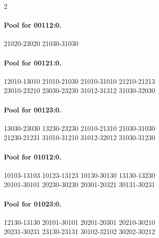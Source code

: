 \documentclass[11pt]{article}
\numberwithin{equation}{section}
\numberwithin{table}{section}
\begin{document}
\begin{multicols}{2}
\paragraph{Pool for 00112:0.}
\begingroup\footnotesize\ttfamily\begin{flushleft}
21020-23020 21030-31030\\
\end{flushleft}\endgroup
\paragraph{Pool for 00121:0.}
\begingroup\footnotesize\ttfamily\begin{flushleft}
12010-13010 21010-21030 21010-31010 21210-21213\\
23010-23210 23030-23230 31012-31312 31030-32030\\
\end{flushleft}\endgroup
\paragraph{Pool for 00123:0.}
\begingroup\footnotesize\ttfamily\begin{flushleft}
13030-23030 13230-23230 21010-21310 21030-31030\\
21230-21231 31010-31210 31012-32012 31030-31230\\
\end{flushleft}\endgroup
\paragraph{Pool for 01012:0.}
\begingroup\footnotesize\ttfamily\begin{flushleft}
10103-13103 10123-13123 10130-30130 13130-13230\\
20101-30101 20230-30230 20301-20321 30131-30231\\
\end{flushleft}\endgroup
\paragraph{Pool for 01023:0.}
\begingroup\footnotesize\ttfamily\begin{flushleft}
12130-13130 20101-30101 20201-20301 20210-30210\\
20231-30231 23130-23131 30102-32102 30202-30212\\
\end{flushleft}\endgroup

\end{multicols}
\end{document}
